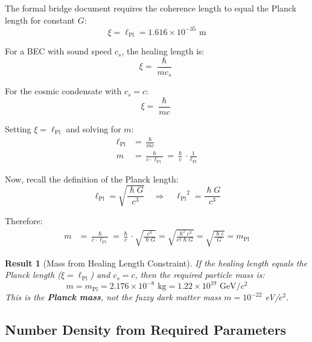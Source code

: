 \documentclass[11pt,a4paper]{article}
\newcommand{\ee}[1]{\times 10^{#1}}
\newcommand{\hbar}{\ensuremath{\hslash}}
\newcommand{\lPl}{\ensuremath{\ell_{\mathrm{Pl}}}}
\newcommand{\mPl}{\ensuremath{m_{\mathrm{Pl}}}}
\newtheorem{result}{Result}
\theoremstyle{definition}
\begin{document}
The formal bridge document requires the coherence length to equal the Planck length for constant $G$:
\begin{equation}
\label{eq:xi_planck}
\xi = \lPl = 1.616 \ee{-35} \text{ m}
\end{equation}

For a BEC with sound speed $c_s$, the healing length is:
\begin{equation}
\label{eq:healing_def}
\xi = \frac{\hbar}{m c_s}
\end{equation}

For the cosmic condensate with $c_s = c$:
\begin{equation}
\label{eq:healing_c}
\xi = \frac{\hbar}{m c}
\end{equation}

Setting $\xi = \lPl$ and solving for $m$:
\begin{align}
\lPl &= \frac{\hbar}{m c} \nonumber \\
m &= \frac{\hbar}{c \cdot \lPl} = \frac{\hbar}{c} \cdot \frac{1}{\lPl}
\end{align}

Now, recall the definition of the Planck length:
\begin{equation}
\lPl = \sqrt{\frac{\hbar G}{c^3}} \quad \Rightarrow \quad \lPl^2 = \frac{\hbar G}{c^3}
\end{equation}

Therefore:
\begin{align}
m &= \frac{\hbar}{c \cdot \lPl} = \frac{\hbar}{c} \cdot \sqrt{\frac{c^3}{\hbar G}} = \sqrt{\frac{\hbar^2 c^3}{c^2 \hbar G}} = \sqrt{\frac{\hbar c}{G}} = \mPl
\end{align}

\begin{result}[Mass from Healing Length Constraint]
If the healing length equals the Planck length ($\xi = \lPl$) and $c_s = c$, then the required particle mass is:
\begin{equation}
\boxed{m = \mPl = 2.176 \times 10^{-8} \text{ kg} = 1.22 \times 10^{19} \text{ GeV}/c^2}
\end{equation}
This is the \textbf{Planck mass}, not the fuzzy dark matter mass $m = 10^{-22}$ eV/$c^2$.
\end{result}

\subsection{Number Density from Required Parameters}
\label{sec:number_density}
\end{document}
